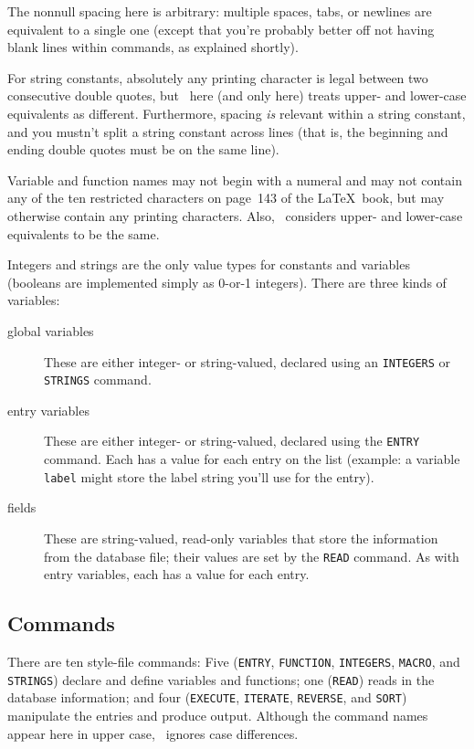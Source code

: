 The nonnull spacing here is arbitrary: multiple spaces, tabs, or newlines
are equivalent to a single one (except that you're probably better off
not having blank lines within commands, as explained shortly).

For string constants, absolutely any printing character
is legal between two consecutive double quotes, but \BibTeX\ here
(and only here) treats upper- and lower-case equivalents as different.
Furthermore, spacing {\em is\/} relevant within a string constant,
and you mustn't split a string constant across lines
(that is, the beginning and ending double quotes must be on the same line).

Variable and function names may not begin with a numeral and
may not contain any of the ten restricted characters
on page~143 of the \LaTeX\ book,
but may otherwise contain any printing characters.
Also, \BibTeX\ considers upper- and lower-case equivalents to be the same.

Integers and strings are the only value types for constants and variables
(booleans are implemented simply as 0-or-1 integers).
There are three kinds of variables:
\begin{description}

\item[global variables\hfill] These are either integer- or string-valued,
declared using an \hbox{\tt INTEGERS} or \hbox{\tt STRINGS} command.

\item[entry variables\hfill] These are either integer- or string-valued,
declared using the \hbox{\tt ENTRY} command.
Each has a value for each entry on the list
(example: a variable \hbox{\tt label} might store
the label string you'll use for the entry).

\item[fields\hfill] These are string-valued, read-only variables
that store the information from the database file;
their values are set by the \hbox{\tt READ} command.
As with entry variables, each has a value for each entry.
\end{description}


\subsection{Commands}

There are ten style-file commands:
Five (\hbox{\tt ENTRY}, \hbox{\tt FUNCTION}, \hbox{\tt INTEGERS},
\hbox{\tt MACRO}, and \hbox{\tt STRINGS})
declare and define variables and functions;
one (\hbox{\tt READ}) reads in the database information;
and four (\hbox{\tt EXECUTE}, \hbox{\tt ITERATE}, \hbox{\tt REVERSE},
and \hbox{\tt SORT}) manipulate the entries and produce output.
Although the command names appear here in upper case,
\BibTeX\ ignores case differences.

